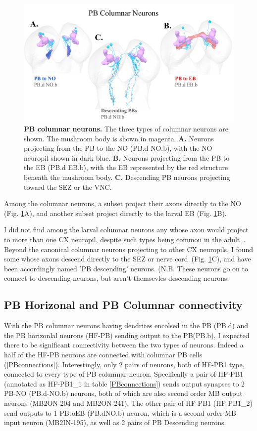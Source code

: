         \begin{figure}[H]
            \centering
            \includegraphics[width=12cm]{Figs/CX/PBcolumnar.pdf}
            \caption[PB columnar neurons]{\textbf{PB columnar neurons.} The three types of columnar neurons are shown. The mushroom body is shown in magenta. \textbf{A.} Neurons projecting from the PB to the NO (PB.d NO.b), with the NO neuropil shown in dark blue. \textbf{B.} Neurons projecting from the PB to the EB (PB.d EB.b), with the EB represented by the red structure beneath the mushroom body. \textbf{C.} Descending PB neurons projecting toward the SEZ or the VNC.}
            \label{pbcolumnar}
        \end{figure}

    Among the columnar neurons, a subset project their axons directly to the NO (Fig. \ref{pbcolumnar}A), and another subset project directly to the larval EB (Fig. \ref{pbcolumnar}B).

    I did not find among the larval columnar neurons any whose axon would project to more than one CX neuropil, despite such types being common in the adult~\citep{wolff2015neuroarchitecture, wolff2018neuroarchitecture, hulse2021connectome}.
    Beyond the canonical columnar neurons projecting to other CX neuropils, I found some whose axons descend directly to the SEZ or nerve cord~(Fig. \ref{pbcolumnar}C), and have been accordingly named 'PB descending' neurons. (N.B. These neurons go on to connect to descending neurons, but aren't themsevles descending neurons.
    
\subsection{PB Horizonal and PB Columnar connectivity}
    With the PB columnar neurons having dendrites encolsed in the PB (PB.d) and the PB horizonlal neurons (HF-PB) sending output to the PB(PB.b), I expected there to be significant connectivity between the two types of neurons. Indeed a half of the HF-PB neurons are connected with columnar PB cells (\ref{PBconnections}).  Interestingly, only 2 pairs of neurons, both of HF-PB1 type, connected to every type of PB columnar neuron. Specifically a pair of HF-PB1 (annotated as HF-PB1\_1 in table \ref{PBconnections}) sends output synapses to 2 PB-NO (PB.d-NO.b) neurons, both of which are also second order MB output neurons (MB2ON-204 and MB2ON-241). The other pair of  HF-PB1 (HF-PB1\_2) send outputs to 1 PBtoEB (PB.dNO.b) neuron, which is a second order MB input neuron (MB2IN-195), as well as 2 pairs of PB Descending neurons. 

